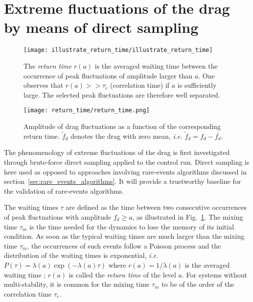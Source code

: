\section{Extreme fluctuations of the drag by means of direct sampling}
\label{sec:direct_sampling}

\begin{figure}
	\centering
	\texttt{[image: illustrate\_return\_time/illustrate\_return\_time]}
	\caption{\label{fig:illustrate_return_time} {The \textit{return time} $r(a)$  is the averaged waiting time between the occurrence of peak fluctuations of amplitude larger than $a$.
            One observes that $r(a) >> \tau_c$ (correlation time) if $a$ is sufficiently large. The selected peak fluctuations are therefore well separated.}
	}
\end{figure}

\begin{figure}
	\centering
	\texttt{[image: return\_time/return\_time.png]}
	\caption{Amplitude of drag fluctuations as a function of the corresponding return time. $\tilde{f}_d$ denotes the drag with zero mean, \textit{i.e.} $\tilde{f}_d = f_d - \overline{f_d}$.
	}
	\label{fig:return_time_instant}
\end{figure}

%
The phenomenology of extreme fluctuations of the drag is first investigated through brute-force direct sampling applied to the control run.
Direct sampling is here used as opposed to approaches involving rare-events algorithms discussed in section~\ref{sec:rare_events_algorithms}.
It will provide a trustworthy baseline for the validation of rare-events algorithms.

The waiting times $\tau$ are defined as the time between two consecutive occurrences of peak fluctuations with amplitude $f_d \geq a$, as illustrated in Fig.~\ref{fig:illustrate_return_time}.
The mixing time $\tau_m$ is the time needed for the dynamics to lose the memory of its initial condition.
As soon as the typical waiting times are much larger than the mixing time $\tau_m$, the occurrences of such events follow a Poisson process and the distribution of the waiting times is exponential, \emph{i.e.} $P(\tau)=\lambda(a)\exp(-\lambda(a)\tau)$ where $r(a)=1/\lambda(a)$ is the averaged waiting time \cite{lestang_computing_2018}; $r(a)$ is called the {\it return time} of the level $a$.
For systems without multi-stability, it is common for the mixing time $\tau_m$ to be of the order of the correlation time $\tau_c$.

